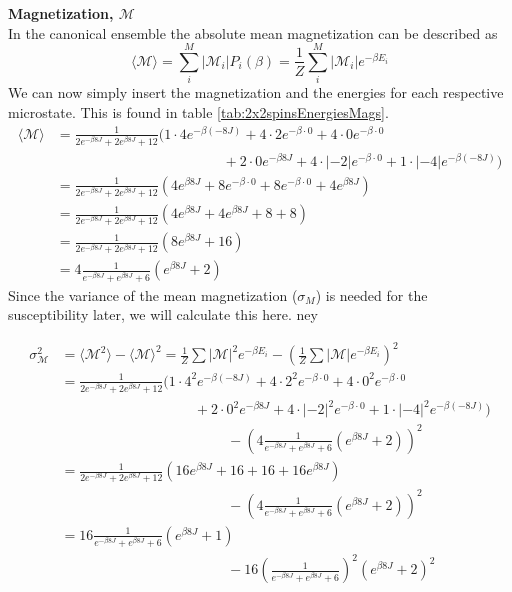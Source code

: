 \documentclass[../main.tex]{subfiles}
\begin{document}
    \textbf{Magnetization, $\mathcal{M}$}\\
    In the canonical ensemble the absolute mean magnetization can be described as
    \[\langle \mathcal{M} \rangle = \sum_i^M |\mathcal{M}_i| P_i(\beta) = \frac{1}{Z} \sum_i^M |\mathcal{M}_i| e^{-\beta E_i}\]
    We can now simply insert the magnetization and the energies for each respective microstate. This is found in table \ref{tab:2x2spinsEnergiesMags}.
    \begin{align*}
      \langle \mathcal{M} \rangle &= \frac{1}{2e^{-\beta 8J} + 2e^{\beta 8J} + 12} \Big( 1\cdot 4 e^{-\beta (-8J)} + 4 \cdot 2  e^{-\beta\cdot 0} + 4 \cdot 0e^{-\beta\cdot 0}\\
      &\hspace{5cm} + 2\cdot 0  e^{-\beta 8J} + 4 \cdot |-2| e^{-\beta \cdot 0} + 1 \cdot |-4| e^{-\beta (-8J)} \Big) \\
      &= \frac{1}{2e^{-\beta 8J} + 2e^{\beta 8J} + 12} \left(4 e^{\beta 8J} + 8e^{-\beta\cdot 0} + 8 e^{-\beta \cdot 0} +4 e^{\beta 8J} \right)\\
      &= \frac{1}{2e^{-\beta 8J} + 2e^{\beta 8J} + 12} \left( 4e^{\beta 8J} +4e^{\beta 8J} +8 +8 \right)\\
      &=\frac{1}{2e^{-\beta 8J} + 2e^{\beta 8J} + 12} \left( 8e^{\beta 8J} +16 \right)\\
      &= 4\frac{1}{e^{-\beta 8J} + e^{\beta 8J} + 6}\left( e^{\beta 8J} +2 \right)
    \end{align*}
    Since the variance of the mean magnetization ($\sigma_M$) is needed for the susceptibility later, we will calculate this here. ney

    \begin{align*}
      \sigma^2_\mathcal{M} &= \langle \mathcal{M}^2 \rangle - \langle \mathcal{M} \rangle ^2 = \frac{1}{Z}\sum |\mathcal{M}|^2 e^{-\beta E_i} - \left( \frac{1}{Z} \sum |\mathcal{M}| e^{-\beta E_i} \right)^2\\
      &= \frac{1}{2e^{-\beta 8J} + 2e^{\beta 8J} + 12} \Big( 1\cdot 4^2 e^{-\beta (-8J)} + 4 \cdot 2^2  e^{-\beta\cdot 0} + 4 \cdot 0^2 e^{-\beta\cdot 0}\\
      &\hspace{4cm} + 2\cdot 0^2  e^{-\beta 8J} + 4 \cdot |-2|^2 e^{-\beta \cdot 0} + 1 \cdot |-4|^2 e^{-\beta (-8J)} \Big)\\
      &\hspace{5cm} - \left(4\frac{1}{e^{-\beta 8J} + e^{\beta 8J} + 6}\left( e^{\beta 8J} +2 \right)\right)^2\\
      &=\frac{1}{2e^{-\beta 8J} + 2e^{\beta 8J} + 12} \left(16e^{\beta 8J} + 16 + 16 + 16e^{\beta 8J} \right)\\
      &\hspace{5cm} - \left(4\frac{1}{e^{-\beta 8J} + e^{\beta 8J} + 6}\left( e^{\beta 8J} +2 \right)\right)^2\\
      &=16 \frac{1}{e^{-\beta 8J} + e^{\beta 8J} + 6} \left(e^{\beta 8J} + 1\right)\\
      &\hspace{5cm} - 16\left(\frac{1}{e^{-\beta 8J} + e^{\beta 8J} + 6}\right)^2\left( e^{\beta 8J} +2 \right)^2
    \end{align*}
\end{document}
